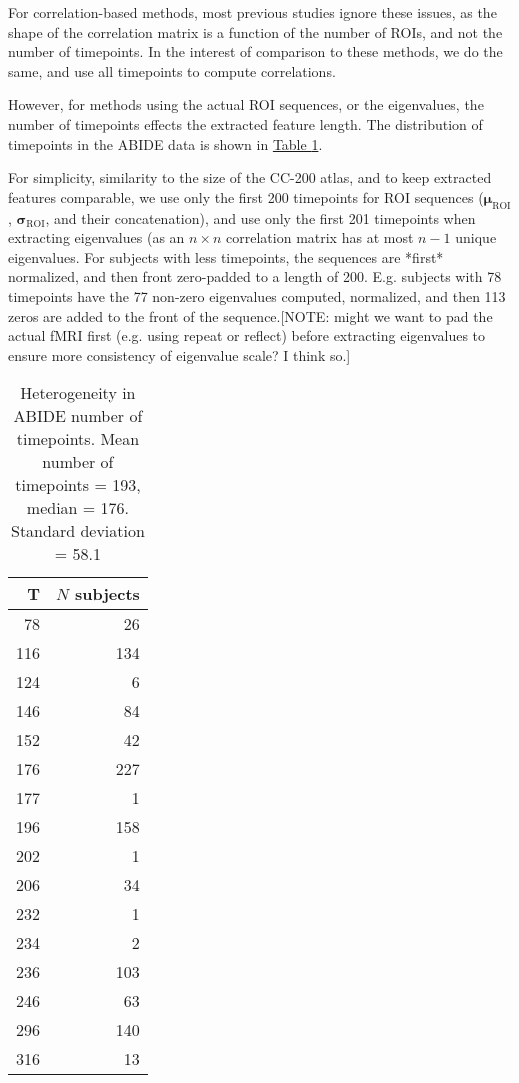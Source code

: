 \documentclass[10pt]{article}
\newcommand{\tsub}[2]{\mathbf{#1}_{\text{#2}}}
\begin{document}
For correlation-based methods, most previous studies ignore these issues, as the shape of the
correlation matrix is a function of the number of ROIs, and not the number of timepoints. In the
interest of comparison to these methods, we do the same, and use all timepoints to compute correlations.

However, for methods using the actual ROI sequences, or the eigenvalues, the number of timepoints
effects the extracted feature length. The distribution of timepoints in the ABIDE data is shown in
\hyperref[tab:timepoints]{Table \ref{tab:timepoints}}.

For simplicity, similarity to the size of the CC-200 atlas, and to keep extracted features
comparable, we use only the first 200 timepoints for ROI sequences (\(\tsub{\mu}{ROI}\),
\(\tsub{\sigma}{ROI}\), and their concatenation), and use only the first 201 timepoints when
extracting eigenvalues (as an \(n \times n\) correlation matrix has at most \(n-1\) unique
eigenvalues. For subjects with less timepoints, the sequences are *first* normalized, and then front
zero-padded to a length of 200. E.g. subjects with 78 timepoints have the 77 non-zero eigenvalues
computed, normalized, and then 113 zeros are added to the front of the sequence.[NOTE: might we want
to pad the actual fMRI first (e.g. using repeat or reflect) before extracting eigenvalues to ensure
more consistency of eigenvalue scale? I think so.]

\begin{table}
  \centering
  \begin{tabular}{rr}
  \toprule
  T &   \(N\) subjects \\
  \midrule
   78 &   26 \\
  116 &  134 \\
  124 &    6 \\
  146 &   84 \\
  152 &   42 \\
  176 &  227 \\
  177 &    1 \\
  196 &  158 \\
  202 &    1 \\
  206 &   34 \\
  232 &    1 \\
  234 &    2 \\
  236 &  103 \\
  246 &   63 \\
  296 &  140 \\
  316 &   13 \\
  \bottomrule
\end{tabular}\label{tab:timepoints}
\caption{Heterogeneity in ABIDE number of timepoints. Mean number of timepoints = 193, median = 176. Standard deviation = 58.1}
\end{table}
\end{document}
